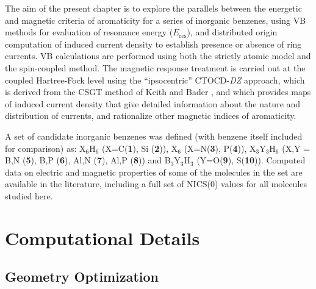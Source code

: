 The aim of the present chapter is to explore the parallels between the
energetic and magnetic criteria of aromaticity for a series of inorganic
benzenes, using VB methods for evaluation of resonance energy ($E_\mathrm{res}$), and
distributed origin computation of induced current density to establish
presence or absence of ring currents. VB calculations are performed using both
the strictly atomic model and the spin-coupled method. The magnetic response treatment is
carried out at the coupled Hartree-Fock
level \cite{ctocd-dz2,ctocd-dz3} using the ``ipsocentric''
 \cite{big,small} CTOCD-\textit{DZ} \cite{ctocd-dz4} approach, which is derived from the CSGT
method of Keith and Bader \cite{ctocd-dz1}, and which provides maps of induced
current density that give detailed information about the nature and
distribution of currents, and rationalize other magnetic indices of
aromaticity.

A set of candidate inorganic benzenes was defined (with benzene itself
included for comparison) as: X$_6$H$_6$ (X=C(\textbf{1}), Si (\textbf{2})),
X$_6$ (X=N(\textbf{3}), P(\textbf{4})), X$_3$Y$_3$H$_6$ (X,Y = B,N
(\textbf{5}), B,P (\textbf{6}), Al,N (\textbf{7}), Al,P (\textbf{8})) and
B$_3$Y$_3$H$_3$ (Y=O(\textbf{9}), S(\textbf{10})). Computed data on electric \cite{lazzeretti}
and magnetic \cite{schleyer1} properties of some of the molecules in the set are available
in the literature, including a
full set of NICS(0) \cite{nics} values for all molecules studied here.    

\section{Computational Details}

\subsection{Geometry Optimization}

